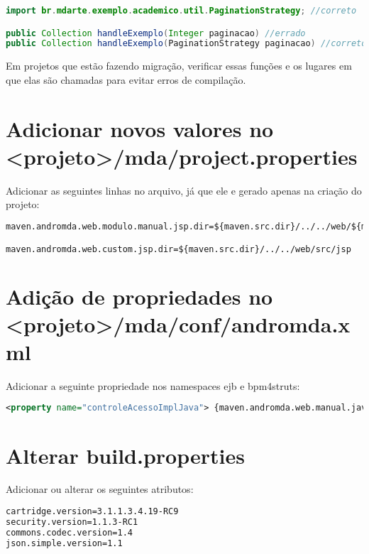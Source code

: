 \begin{framed}
\begin{lstlisting}[language=java]
import br.mdarte.exemplo.academico.util.PaginationStrategy; //correto

public Collection handleExemplo(Integer paginacao) //errado
public Collection handleExemplo(PaginationStrategy paginacao) //correto
\end{lstlisting}
\end{framed}

Em projetos que estão fazendo migração, verificar essas funções e os lugares em
que elas são chamadas para evitar erros de compilação.

\section{Adicionar novos valores no <projeto>/mda/project.properties}
Adicionar as seguintes linhas no arquivo, já que ele e gerado apenas na criação
do projeto:

\begin{framed}
\begin{lstlisting}[language=xml]
maven.andromda.web.modulo.manual.jsp.dir=${maven.src.dir}/../../web/${maven.andromda.module.name.outlet.replace}/src/jsp

maven.andromda.web.custom.jsp.dir=${maven.src.dir}/../../web/src/jsp
\end{lstlisting}
\end{framed}

\section{Adição de propriedades no <projeto>/mda/conf/andromda.xml}
Adicionar a seguinte propriedade nos namespaces ejb e bpm4struts:

\begin{framed}
\begin{lstlisting}[language=xml]
<property name="controleAcessoImplJava"> {maven.andromda.web.manual.java.dir}</property>
\end{lstlisting}
\end{framed}

\section{Alterar build.properties}
Adicionar ou alterar os seguintes atributos:

\begin{framed}
\begin{lstlisting}[language=xml]
cartridge.version=3.1.1.3.4.19-RC9
security.version=1.1.3-RC1
commons.codec.version=1.4
json.simple.version=1.1
\end{lstlisting}
\end{framed}

